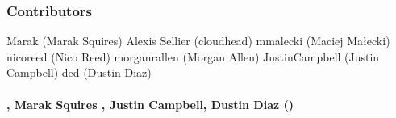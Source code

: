 \subsubsection*{Contributors}

Marak (Marak Squires) Alexis Sellier (cloudhead) mmalecki (Maciej Małecki) nicoreed (Nico Reed) morganrallen (Morgan Allen) Justin\+Campbell (Justin Campbell) ded (Dustin Diaz)

\paragraph*{, Marak Squires , Justin Campbell, Dustin Diaz ()}